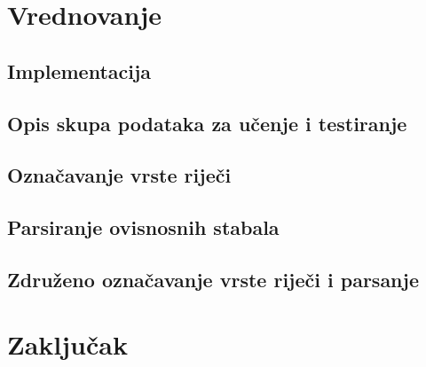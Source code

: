 \documentclass[times, utf8, diplomski]{fer}
\begin{document}
\chapter{Vrednovanje}\label{ch:evaluation}

\section{Implementacija}


\section{Opis skupa podataka za učenje i testiranje}


\section{Označavanje vrste riječi}


\section{Parsiranje ovisnosnih stabala}


\section{Združeno označavanje vrste riječi i parsanje}


\chapter{Zaključak}









\end{document}
